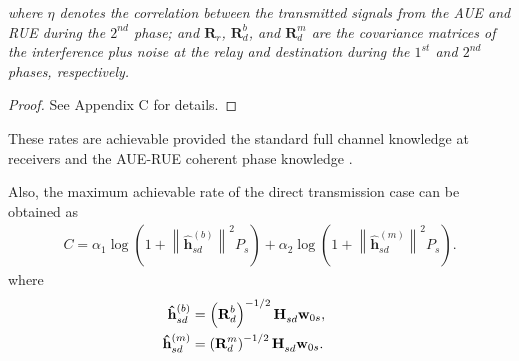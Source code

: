 \documentclass[12pt, draftclsnofoot, onecolumn]{IEEEtran}
\theoremstyle{plain}
\newcommand{\norm}[1]{\left\lVert#1\right\rVert}
\begin{document}
\textit{where $\eta$ denotes the correlation between the transmitted signals from the AUE and RUE during the $2^{nd}$ phase; and $\textbf{R}_r$, $\textbf{R}_{d}^b$, and $\textbf{R}_{d}^m$ are the covariance matrices of the interference plus noise at the relay and destination during the $1^{st}$ and $2^{nd}$ phases, respectively.}
\begin{proof}
See Appendix C for details.
\end{proof}
%
These rates are achievable provided the standard full channel knowledge at receivers and the AUE-RUE coherent phase knowledge \cite{ref_3f,ref_4f}.%
%

%
Also, the maximum achievable rate of the direct transmission case can be obtained as
\begin{align}\label{RateDEq}
\!\!\!\!\!\!C\!\!=\!\! \alpha_1 \log{\left( 1+\norm{\mathbf{\hat{h}}_{sd}^{(b)}}^2 P_{s} \right)} \!\!+\!\! \alpha_2 \log{\left( 1+\norm{\mathbf{\hat{h}}_{sd}^{(m)}}^2 P_{s} \right)}.
\end{align}
where
\begin{align}\label{Channels2_2}
{\mathbf{\hat{h}}_{sd}^{(b)}}&={\left(\textbf{R}_{d}^b\right)^{-1/2} \textbf{H}_{sd}^{} \textbf{w}_{0s}},&&\quad\;\notag\\
{\mathbf{\hat{h}}_{sd}^{(m)}}&={\left(\textbf{R}_{d}^m\right)^{-1/2} \textbf{H}_{sd}^{} \textbf{w}_{0s}}.&&
%
\end{align} 
\end{document}
